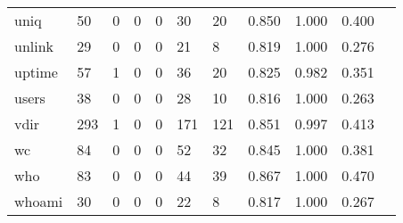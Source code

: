 \begin{longtable}{lp{1.10cm}p{1.10cm}p{1.10cm}p{1.10cm}p{1.10cm}p{1.10cm}p{1.10cm}p{1.10cm}p{1.10cm}p{1.10cm}}
uniq      &                     50 &                                  0 &                                 0 &                                0 &                                30 &                              20 &                          0.850 &                                 1.000 &                               0.400 \\
unlink    &                     29 &                                  0 &                                 0 &                                0 &                                21 &                               8 &                          0.819 &                                 1.000 &                               0.276 \\
uptime    &                     57 &                                  1 &                                 0 &                                0 &                                36 &                              20 &                          0.825 &                                 0.982 &                               0.351 \\
users     &                     38 &                                  0 &                                 0 &                                0 &                                28 &                              10 &                          0.816 &                                 1.000 &                               0.263 \\
vdir      &                    293 &                                  1 &                                 0 &                                0 &                               171 &                             121 &                          0.851 &                                 0.997 &                               0.413 \\
wc        &                     84 &                                  0 &                                 0 &                                0 &                                52 &                              32 &                          0.845 &                                 1.000 &                               0.381 \\
who       &                     83 &                                  0 &                                 0 &                                0 &                                44 &                              39 &                          0.867 &                                 1.000 &                               0.470 \\
whoami    &                     30 &                                  0 &                                 0 &                                0 &                                22 &                               8 &                          0.817 &                                 1.000 &                               0.267 \\

\end{longtable}
